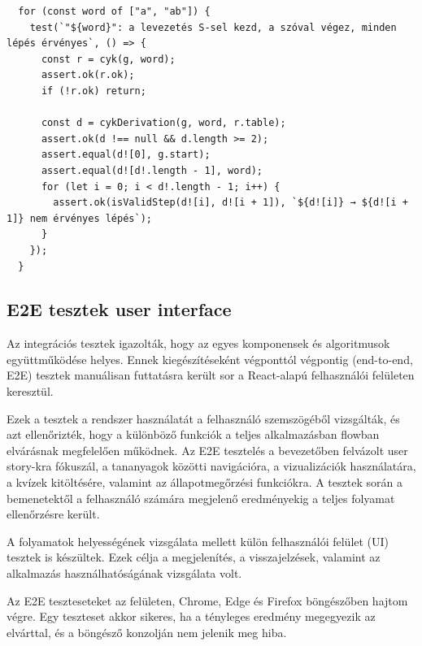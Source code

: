 \begin{lstlisting}
  for (const word of ["a", "ab"]) {
    test(`"${word}": a levezetés S-sel kezd, a szóval végez, minden lépés érvényes`, () => {
      const r = cyk(g, word);
      assert.ok(r.ok);
      if (!r.ok) return;

      const d = cykDerivation(g, word, r.table);
      assert.ok(d !== null && d.length >= 2);
      assert.equal(d![0], g.start);
      assert.equal(d![d!.length - 1], word);
      for (let i = 0; i < d!.length - 1; i++) {
        assert.ok(isValidStep(d![i], d![i + 1]), `${d![i]} → ${d![i + 1]} nem érvényes lépés`);
      }
    });
  }
\end{lstlisting}

\subsection{E2E tesztek user interface}
Az integrációs tesztek igazolták, 
hogy az egyes komponensek és algoritmusok együttműködése helyes. 
Ennek kiegészítéseként végponttól végpontig (end-to-end, E2E) tesztek manuálisan futtatásra került sor a React-alapú felhasználói felületen keresztül.

Ezek a tesztek a rendszer használatát a felhasználó szemszögéből vizsgálták, és azt ellenőrizték, hogy a különböző funkciók a teljes alkalmazásban flowban
elvárásnak megfelelően működnek.
Az E2E tesztelés a bevezetőben felvázolt user story-kra fókuszál, a tananyagok közötti navigációra, a vizualizációk használatára, a kvízek kitöltésére,
 valamint az állapotmegőrzési funkciókra. 
A tesztek során a bemenetektől a felhasználó számára megjelenő eredményekig a teljes folyamat ellenőrzésre került.

A folyamatok helyességének vizsgálata mellett külön felhasználói felület (UI) tesztek is készültek.
 Ezek célja a megjelenítés, a visszajelzések, valamint az alkalmazás használhatóságának vizsgálata volt.

\label{sec:e2e}
Az E2E teszteseteket az felületen, Chrome, Edge és
Firefox böngészőben hajtom végre. Egy teszteset akkor sikeres, ha a
tényleges eredmény megegyezik az elvárttal, és a böngésző konzolján nem
jelenik meg hiba.

